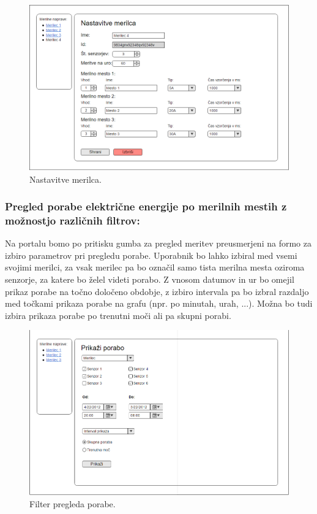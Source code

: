 \documentclass[12pt,a4paper,titlepage,openany]{report}
\begin{document}
\begin{figure}[H]
\begin{center}
\includegraphics[width=1\linewidth]{Slike/UrejanjeMerilca.png}
\end{center}
\caption{Nastavitve merilca.}\label{slika:UrejanjeMerilca}
\end{figure}

\subsubsection{Pregled porabe električne energije po merilnih mestih z možnostjo različnih filtrov:}
Na portalu bomo po pritisku gumba za pregled meritev preusmerjeni na formo za izbiro parametrov pri pregledu porabe. Uporabnik bo lahko izbiral med vsemi svojimi merilci, za vsak merilec pa bo označil samo tista merilna mesta oziroma senzorje, za katere bo želel videti porabo. Z vnosom datumov in ur bo omejil prikaz porabe na točno določeno obdobje, z izbiro intervala pa bo izbral razdaljo med točkami prikaza porabe na grafu (npr. po minutah, urah, ...). Možna bo tudi izbira prikaza porabe po trenutni moči ali pa skupni porabi.

\begin{figure}[H]
\begin{center}
\includegraphics[width=1\linewidth]{Slike/IzbiraPregledaPorabe.png}
\end{center}
\caption{Filter pregleda porabe.}\label{slika:IzbiraPregledaPorabe}
\end{figure}
\end{document}
